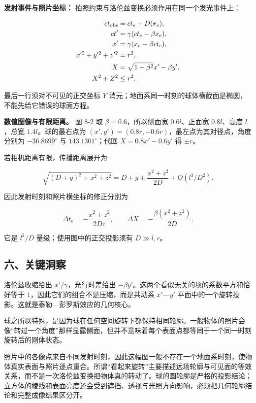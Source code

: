 \documentclass[12pt,a4paper,UTF8]{ctexart}
\begin{document}
\textbf{发射事件与照片坐标：}
拍照约束与洛伦兹变换必须作用在同一个发光事件上：

\[\begin{aligned}
ct_{\rm obs}&=ct_e+D(\boldsymbol r_e),\\
ct'&=\gamma(ct_e-\beta x_e),\\
x'&=\gamma(x_e-\beta ct_e),\\
x'^2+y'^2+z'^2&=r^2,\\
X&=\sqrt{1-\beta^2}x'-\beta y',\\
X^2+Z^2&\le r^2.
\end{aligned}\]

最后一行须对不可见的正交坐标 \(Y\)
消元；地面系同一时刻的球体横截面是椭圆，不能先给它错误的球面方程。

\textbf{数值图像与有限距离。} 图 8-2 取 \(\beta=0.6\)，所以侧面宽
\(0.6l\)、正面宽 \(0.8l\)、高度 \(l\)，总宽 \(1.4l\)。球的最右点为
\((x',y')=(0.8r,-0.6r)\)，最左点为其对径点，角度分别为
\(-36.8699^\circ\) 与 \(143.1301^\circ\)；代回 \(X=0.8x'-0.6y'\) 得
\(\pm r\)。

若相机距离有限，传播距离展开为

\[\sqrt{(D+y)^2+x^2+z^2}=D+y+\frac{x^2+z^2}{2D}+O(l^3/D^2).\]

因此发射时刻和照片横坐标的修正分别为

\[\Delta t_e=-\frac{x^2+z^2}{2Dc},\qquad \Delta X=-\frac{\beta(x^2+z^2)}{2D}.\]

它是 \(l^2/D\) 量级；使用图中的正交投影须有 \(D\gg l,r\)。

\subsection{六、关键洞察}\label{ux516dux5173ux952eux6d1eux5bdf-7}

洛伦兹收缩给出 \(x'/\gamma\)，光行时差给出
\(-\beta y'\)。这两个看似无关的项的系数平方和恰好等于
\(1\)，因此它们的组合不是压缩，而是共动系 \(x'\)---\(y'\)
平面中的一个旋转投影。这就是泰勒---彭罗斯效应的几何核心。

球之所以特殊，是因为球在任何空间旋转下都保持相同轮廓。一般物体的照片会像``转过一个角度''那样显露侧面，但并不意味着每个表面点都等同于一个同一时刻旋转后的刚体状态。

照片中的各像点来自不同发射时刻，因此这幅图一般不存在一个地面系时刻，使物体真实表面与照片逐点重合。所谓``看起来旋转''主要描述远场轮廓与可见面的等效关系，而不是一次洛伦兹变换把物体真的转动了。球的圆轮廓是严格的投影结论；立方体的棱线和表面亮度还会受到遮挡、透视与光照方向影响，必须把几何轮廓结论和完整成像结果区分开。
\end{document}
